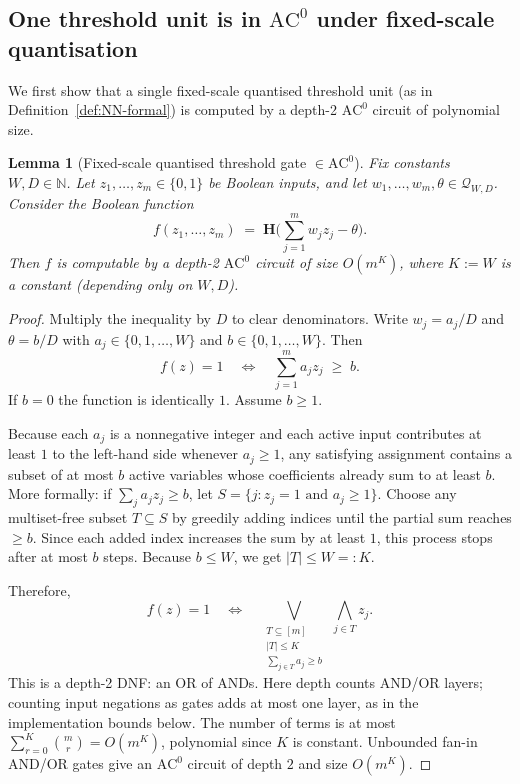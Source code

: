\documentclass[11pt]{article}
\newcommand{\AC}{\mathrm{AC}}
\newcommand{\Heav}{\mathbf{H}}
\newcommand{\bits}{\{0,1\}}
\newcommand{\N}{\mathbb{N}}
\newcommand{\Qset}{\mathcal{Q}}
\theoremstyle{plain}
\newtheorem{lemma}[theorem]{Lemma}
\theoremstyle{definition}
\theoremstyle{remark}
\numberwithin{equation}{section}
\begin{document}
\subsection{One threshold unit is in \texorpdfstring{$\AC^0$}{AC0} under fixed-scale quantisation}
\label{app:oneunit}

We first show that a single fixed-scale quantised threshold unit (as in Definition~\ref{def:NN-formal}) is computed by a depth-2 $\AC^0$ circuit of polynomial size.

\begin{lemma}[Fixed-scale quantised threshold gate $\in\AC^0$]
\label{lem:unit-ac0}
Fix constants $W,D\in\N$.
Let $z_1,\dots,z_m\in\bits$ be Boolean inputs, and let $w_1,\dots,w_m,\theta\in\Qset_{W,D}$.
Consider the Boolean function
\[
f(z_1,\dots,z_m) \;=\; \Heav\!\Big(\sum_{j=1}^m w_j z_j - \theta\Big).
\]
Then $f$ is computable by a depth-2 $\AC^0$ circuit of size $O(m^K)$, where $K:=W$ is a constant (depending only on $W,D$).
\end{lemma}

\begin{proof}
Multiply the inequality by $D$ to clear denominators.
Write $w_j=a_j/D$ and $\theta=b/D$ with $a_j\in\{0,1,\dots,W\}$ and $b\in\{0,1,\dots,W\}$.
Then
\[
f(z)=1 \quad\Longleftrightarrow\quad \sum_{j=1}^m a_j z_j \;\ge\; b.
\]
If $b=0$ the function is identically $1$. Assume $b\ge 1$.

Because each $a_j$ is a nonnegative integer and each active input contributes at least $1$ to the left-hand side whenever $a_j\ge 1$, any satisfying assignment contains a subset of at most $b$ active variables whose coefficients already sum to at least $b$.
More formally: if $\sum_j a_j z_j \ge b$, let $S=\{j:z_j=1 \text{ and } a_j\ge 1\}$. Choose any multiset-free subset $T\subseteq S$ by greedily adding indices until the partial sum reaches $\ge b$. Since each added index increases the sum by at least $1$, this process stops after at most $b$ steps. Because $b\le W$, we get $|T|\le W=:K$.

Therefore,
\[
f(z)=1 \quad\Longleftrightarrow\quad
\bigvee_{\substack{T\subseteq[m]\\ |T|\le K\\ \sum_{j\in T} a_j\ge b}}
\ \bigwedge_{j\in T} z_j.
\]
This is a depth-2 DNF: an OR of ANDs. Here depth counts AND/OR layers; counting input negations as gates adds at most one layer, as in the implementation bounds below.
The number of terms is at most $\sum_{r=0}^K \binom{m}{r}=O(m^K)$, polynomial since $K$ is constant.
Unbounded fan-in AND/OR gates give an $\AC^0$ circuit of depth $2$ and size $O(m^K)$.
\end{proof}
\end{document}
